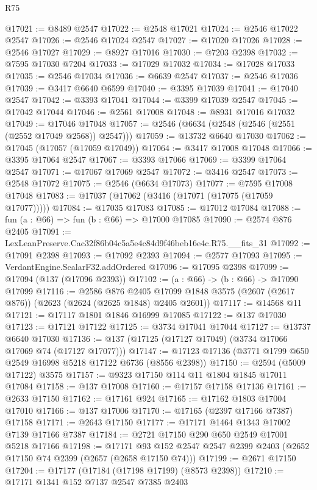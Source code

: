 \begin{lexlean}{R75}
\begin{coremodule}
@17021 := @8489 @2547
@17022 := @2548 @17021
@17024 := @2546 @17022 @2547
@17026 := @2546 @17024 @2547
@17027 := @17020 @17026
@17028 := @2546 @17027
@17029 := @8927 @17016
@17030 := @7203 @2398
@17032 := @7595 @17030 @7204
@17033 := @17029 @17032
@17034 := @17028 @17033
@17035 := @2546 @17034
@17036 := @6639 @2547
@17037 := @2546 @17036
@17039 := @3417 @6640 @6599
@17040 := @3395 @17039
@17041 := @17040 @2547
@17042 := @3393 @17041
@17044 := @3399 @17039 @2547
@17045 := @17042 @17044
@17046 := @2561 @17008
@17048 := @8931 @17016 @17032
@17049 := @17046 @17048
@17057 := @2546 (@6634 (@2548 (@2546 (@2551 (@2552 @17049 @2568)) @2547)))
@17059 := @13732 @6640 @17030
@17062 := @17045 (@17057 (@17059 @17049))
@17064 := @3417 @17008 @17048
@17066 := @3395 @17064 @2547
@17067 := @3393 @17066
@17069 := @3399 @17064 @2547
@17071 := @17067 @17069 @2547
@17072 := @3416 @2547
@17073 := @2548 @17072
@17075 := @2546 (@6634 @17073)
@17077 := @7595 @17008 @17048
@17083 := @17037 (@17062 (@3416 (@17071 (@17075 (@17059 @17077)))))
@17084 := @17035 @17083
@17085 := @17012 @17084
@17088 := fun (a : @66) => fun (b : @66) => @17000 @17085
@17090 := @2574 @876 @2405
@17091 := LexLeanPreserve.Cac32f86b04c5a5e4c84d9f46beb16e4c.R75.__fits_31
@17092 := @17091 @2398
@17093 := @17092 @2393
@17094 := @2577 @17093
@17095 := VerdantEngine.ScalarF32.addOrdered
@17096 := @17095 @2398
@17099 := @17094 (@137 (@17096 @2393))
@17102 := (a : @66) -> (b : @66) -> @17090 @17099
@17116 := @2586
    @876
    @2405
    @17099
    @1848
    @3575
    (@2607 (@2617 @876))
    (@2623 (@2624 (@2625 @1848) @2405 @2601))
@17117 := @14568 @11
@17121 := @17117 @1801 @1846 @16999 @17085
@17122 := @137 @17030
@17123 := @17121 @17122
@17125 := @3734 @17041 @17044
@17127 := @13737 @6640 @17030
@17136 := @137 (@17125 (@17127 @17049) (@3734 @17066 @17069 @74 (@17127 @17077)))
@17147 := @17123 @17136 (@3771 @1799 @650 @2549 @16998 @5218 @17122 @6736 (@8556 @2398))
@17150 := @2594 (@5009 @17122) @3575
@17157 := @9323 @17150 @114 @11 @1804 @1845 @17011 @17084
@17158 := @137 @17008
@17160 := @17157 @17158 @17136
@17161 := @2633 @17150
@17162 := @17161 @924
@17165 := @17162 @1803 @17004 @17010
@17166 := @137 @17006
@17170 := @17165 (@2397 @17166 @7387) @17158
@17171 := @2643 @17150
@17177 := @17171 @1464 @1343 @17002 @7139 @17166 @7387
@17184 := @2721 @17150 @290 @650 @2549 @17001 @5218 @17166
@17198 := @17171
    @93
    @152
    @2547
    @2547
    @2399
    @2403
    (@2652 @17150 @74 @2399 (@2657 (@2658 @17150 @74)))
@17199 := @2671 @17150
@17204 := @17177 (@17184 (@17198 @17199) (@8573 @2398))
@17210 := @17171 @1341 @152 @7137 @2547 @7385 @2403

\end{coremodule}
\end{lexlean}
